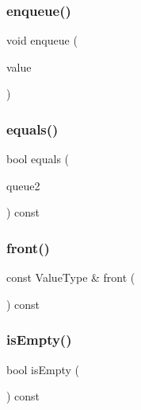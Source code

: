 \mbox{\label{classQueue_a663f69ed5d98f3f167202e9b2d7e7a9a}} 
\subsubsection{\texorpdfstring{enqueue()}{enqueue()}}
{\footnotesize\ttfamily void enqueue (\begin{DoxyParamCaption}\item[{const Value\+Type \&}]{value }\end{DoxyParamCaption})}

\mbox{\label{classQueue_aafa8534374662afc7fedc3e1ffb72c08}} 
\subsubsection{\texorpdfstring{equals()}{equals()}}
{\footnotesize\ttfamily bool equals (\begin{DoxyParamCaption}\item[{const \mbox{\hyperlink{classQueue}{Queue}}$<$ Value\+Type $>$ \&}]{queue2 }\end{DoxyParamCaption}) const}

\mbox{\label{classQueue_a02aaa52ad7a120201f6dd3e90eff737f}} 
\subsubsection{\texorpdfstring{front()}{front()}}
{\footnotesize\ttfamily const Value\+Type \& front (\begin{DoxyParamCaption}{ }\end{DoxyParamCaption}) const}

\mbox{\label{classQueue_acf82f9b2937375c7b1cf3dccb3df3312}} 
\subsubsection{\texorpdfstring{is\+Empty()}{isEmpty()}}
{\footnotesize\ttfamily bool is\+Empty (\begin{DoxyParamCaption}{ }\end{DoxyParamCaption}) const}

